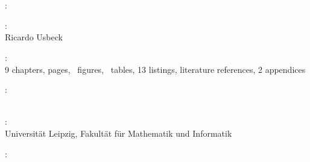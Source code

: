 \thispagestyle{empty}

\hfill

\vfill

~\\
\noindent{}\\



\noindent{}: \\
\myTitle 

\medskip

\noindent{}: \\
Ricardo Usbeck %

\medskip

\noindent{}: \\
9 chapters, \pageref{LastPage} pages, \totfig\ figures, \tottab\ tables, 13 listings,  literature references, 2 appendices

\medskip

\noindent{}: \\
\myProf \\
\mySupervisor

\medskip

\noindent{}: \\
Universität Leipzig, Fakultät für Mathematik und Informatik

\medskip

\noindent{}: \\
\myTime
